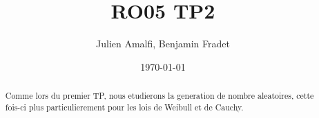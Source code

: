 \documentclass{article}
\title{RO05 TP2}
\author{Julien Amalfi, Benjamin Fradet}
\date{\today}
\begin{document}
\maketitle
\thispagestyle{fancy}


\begin{abstract}

    Comme lors du premier TP, nous etudierons la generation de nombre
    aleatoires, cette fois-ci plus particulierement pour les lois de Weibull et
    de Cauchy.

\end{abstract}

\end{document}
